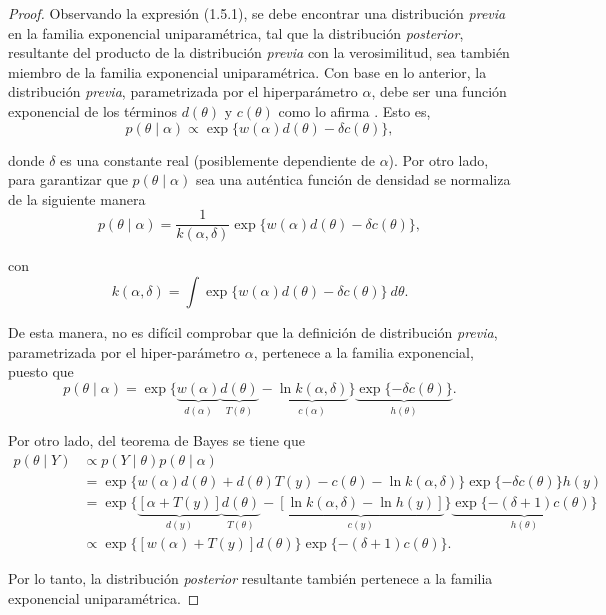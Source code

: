 \documentclass[10pt,openright]{book}\usepackage[]{graphicx}\usepackage[]{color}
\begin{document}
\begin{proof}
Observando la expresión (1.5.1), se debe encontrar una distribución \emph{previa} en la familia exponencial uniparamétrica, tal que la distribución \emph{posterior}, resultante del producto de la distribución \emph{previa} con la verosimilitud, sea también miembro de la familia exponencial uniparamétrica. Con base en lo anterior, la distribución \emph{previa}, parametrizada por el hiperparámetro $\alpha$, debe ser una función exponencial de los términos $d(\theta)$ y $c(\theta)$ como lo afirma . Esto es,
\begin{equation}
p(\theta \mid \alpha)\propto\exp\{w(\alpha) d(\theta)-\delta c(\theta)\},
\end{equation}

donde $\delta$ es una constante real (posiblemente dependiente de $\alpha$). Por otro lado, para garantizar que $p(\theta \mid \alpha)$ sea una auténtica función de densidad se normaliza de la siguiente manera
\begin{equation}
p(\theta \mid \alpha)=\frac{1}{k(\alpha,\delta)}\exp\{w(\alpha) d(\theta)-\delta c(\theta)\},
\end{equation}

con
\begin{equation*}
k(\alpha,\delta)=\int\exp\{w(\alpha) d(\theta)-\delta c(\theta)\} \ d\theta.
\end{equation*}

De esta manera, no es difícil comprobar que la definición de distribución \emph{previa}, parametrizada por el hiper-parámetro $\alpha$, pertenece a la familia exponencial, puesto que
\begin{equation}
p(\theta \mid \alpha)=\exp\{\underbrace{w(\alpha)}_{d(\alpha)} \underbrace{d(\theta)}_{T(\theta)} - \underbrace{\ln k(\alpha,\delta)}_{c(\alpha)}\}\underbrace{\exp\{-\delta c(\theta)\}}_{h(\theta)}.
\end{equation}

Por otro lado, del teorema de Bayes se tiene que
\begin{align*}
p(\theta \mid Y) &\propto p(Y \mid \theta)p(\theta \mid \alpha)\\
&=\exp\{w(\alpha) d(\theta) + d(\theta)T(y) - c(\theta) -\ln k(\alpha,\delta) \}\exp\{-\delta c(\theta)\}h(y)\\
&=\exp\{\underbrace{[\alpha+T(y)]}_{d(y)} \underbrace{d(\theta)}_{T(\theta)} -\underbrace{[\ln k(\alpha,\delta)-\ln h(y)]}_{c(y)}\} \underbrace{\exp\{-(\delta+1) c(\theta)\}}_{h(\theta)}\\
&\propto \exp\{[w(\alpha)+T(y)] d(\theta)\}\exp\{-(\delta+1) c(\theta)\}.
\end{align*}

Por lo tanto, la distribución \emph{posterior} resultante también pertenece a la familia exponencial uniparamétrica.
\end{proof}
\end{document}
